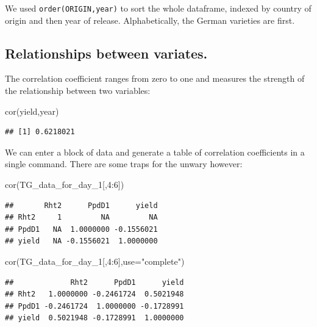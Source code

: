\documentclass[
]{book}
\newenvironment{Shaded}{\begin{snugshade}}{\end{snugshade}}
\newcommand{\AttributeTok}[1]{\textcolor[rgb]{0.77,0.63,0.00}{#1}}
\newcommand{\DecValTok}[1]{\textcolor[rgb]{0.00,0.00,0.81}{#1}}
\newcommand{\FunctionTok}[1]{\textcolor[rgb]{0.00,0.00,0.00}{#1}}
\newcommand{\NormalTok}[1]{#1}
\newcommand{\SpecialCharTok}[1]{\textcolor[rgb]{0.00,0.00,0.00}{#1}}
\newcommand{\StringTok}[1]{\textcolor[rgb]{0.31,0.60,0.02}{#1}}
\begin{document}
We used \texttt{order(ORIGIN,year)} to sort the whole dataframe, indexed by country of origin and then year of release. Alphabetically, the German varieties are first.

\hypertarget{relationships-between-variates.}{%
\subsection{Relationships between variates.}\label{relationships-between-variates.}}

The correlation coefficient ranges from zero to one and measures the strength of the relationship between two variables:

\begin{Shaded}
\begin{Highlighting}[]
\FunctionTok{cor}\NormalTok{(yield,year)}
\end{Highlighting}
\end{Shaded}

\begin{verbatim}
## [1] 0.6218021
\end{verbatim}

We can enter a block of data and generate a table of correlation coefficients in a single command.
There are some traps for the unwary however:

\begin{Shaded}
\begin{Highlighting}[]
\FunctionTok{cor}\NormalTok{(TG\_data\_for\_day\_1[,}\DecValTok{4}\SpecialCharTok{:}\DecValTok{6}\NormalTok{])}
\end{Highlighting}
\end{Shaded}

\begin{verbatim}
##       Rht2      PpdD1      yield
## Rht2     1         NA         NA
## PpdD1   NA  1.0000000 -0.1556021
## yield   NA -0.1556021  1.0000000
\end{verbatim}

\begin{Shaded}
\begin{Highlighting}[]
\FunctionTok{cor}\NormalTok{(TG\_data\_for\_day\_1[,}\DecValTok{4}\SpecialCharTok{:}\DecValTok{6}\NormalTok{],}\AttributeTok{use=}\StringTok{"complete"}\NormalTok{)}
\end{Highlighting}
\end{Shaded}

\begin{verbatim}
##             Rht2      PpdD1      yield
## Rht2   1.0000000 -0.2461724  0.5021948
## PpdD1 -0.2461724  1.0000000 -0.1728991
## yield  0.5021948 -0.1728991  1.0000000
\end{verbatim}
\end{document}
